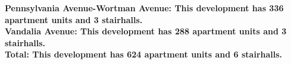 \bf{Pennsylvania Avenue-Wortman Avenue}: This development has 336 apartment units and 3 stairhalls.\\\bf{Vandalia Avenue}: This development has 288 apartment units and 3 stairhalls.\\\bf{Total}: This development has 624 apartment units and 6 stairhalls.\\